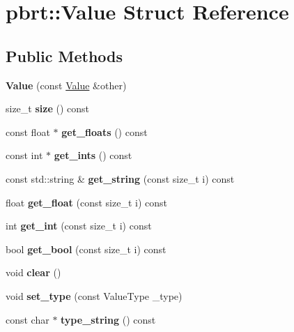\hypertarget{structpbrt_1_1_value}{}\section{pbrt\+:\+:Value Struct Reference}
\label{structpbrt_1_1_value}
\subsection*{Public Methods}
\begin{DoxyCompactItemize}
\item 
\mbox{\label{structpbrt_1_1_value_acb9858ecc4a6bf502478d445dff63ba1}} 
{\bfseries Value} (const \hyperlink{structpbrt_1_1_value}{Value} \&other)
\item 
\mbox{\label{structpbrt_1_1_value_a14edea1f667a0691a0bb992e811504a0}} 
size\+\_\+t {\bfseries size} () const
\item 
\mbox{\label{structpbrt_1_1_value_a6bdea8fa2e790eccada39e06c8829d77}} 
const float $\ast$ {\bfseries get\+\_\+floats} () const
\item 
\mbox{\label{structpbrt_1_1_value_aa17433ba500f6acda552490e47584c63}} 
const int $\ast$ {\bfseries get\+\_\+ints} () const
\item 
\mbox{\label{structpbrt_1_1_value_a6cb1c65cce3f30d685ae652bbd7e6875}} 
const std\+::string \& {\bfseries get\+\_\+string} (const size\+\_\+t i) const
\item 
\mbox{\label{structpbrt_1_1_value_a174a2d64275395e1876f0642e066bc40}} 
float {\bfseries get\+\_\+float} (const size\+\_\+t i) const
\item 
\mbox{\label{structpbrt_1_1_value_a4d094c7884041a85bf80f8f9d6335b55}} 
int {\bfseries get\+\_\+int} (const size\+\_\+t i) const
\item 
\mbox{\label{structpbrt_1_1_value_aa3f5ecbc3a25a8e732b502c6797e9a41}} 
bool {\bfseries get\+\_\+bool} (const size\+\_\+t i) const
\item 
\mbox{\label{structpbrt_1_1_value_a6528bb64a3ab0c2ea029b2b78eec315e}} 
void {\bfseries clear} ()
\item 
\mbox{\label{structpbrt_1_1_value_ad66a52a0fecd5a45c0e2e7208e6f8793}} 
void {\bfseries set\+\_\+type} (const Value\+Type \+\_\+type)
\item 
\mbox{\label{structpbrt_1_1_value_a7026e5b14959d74750eff7a88d23cbcc}} 
const char $\ast$ {\bfseries type\+\_\+string} () const
\end{DoxyCompactItemize}
